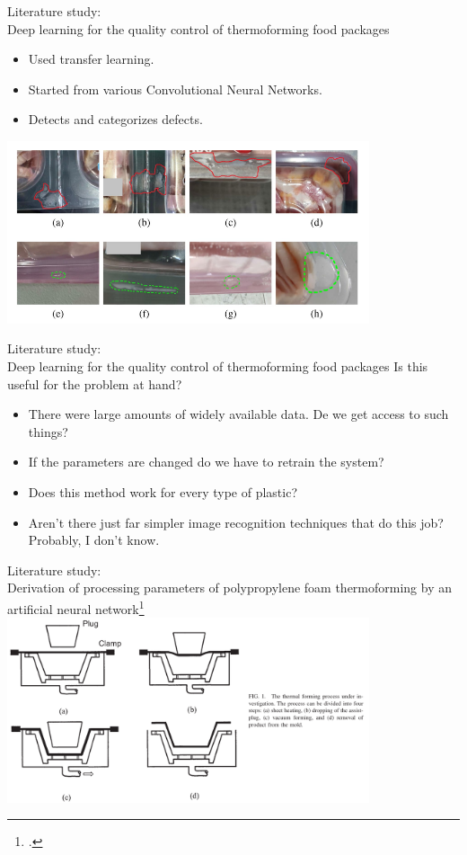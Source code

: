 \documentclass{beamer}
\begin{document}
	\begin{frame}{Literature study:\\Deep learning for the quality control of thermoforming food packages}
		\begin{itemize}
			\item Used transfer learning.
			\item Started from various Convolutional Neural Networks.
			\item Detects and categorizes defects.
		\end{itemize}
		\centering
		\includegraphics[width=0.8\textwidth]{Figures/DefectsOfPlastic.pdf}
	\end{frame}
	
	\begin{frame}{Literature study:\\Deep learning for the quality control of thermoforming food packages}
		Is this useful for the problem at hand?
		\pause
		\begin{itemize}
			\item There were large amounts of widely available data. De we get access to such things?
			\pause
			\item If the parameters are changed do we have to retrain the system?
			\pause
			\item Does this method work for every type of plastic?
			\pause
			\item Aren't there just far simpler image recognition techniques that do this job? Probably, I don't know.
		\end{itemize}
	\end{frame}

	\begin{frame}{Literature study:\\Derivation of processing parameters of polypropylene foam thermoforming by an artificial neural network\footcite{https://doi.org/10.1002/pen.20287}}
		\centering
		\includegraphics[width=0.8\textwidth]{Figures/FoamCupThemoformingProcess.pdf}
	\end{frame}
\end{document}
